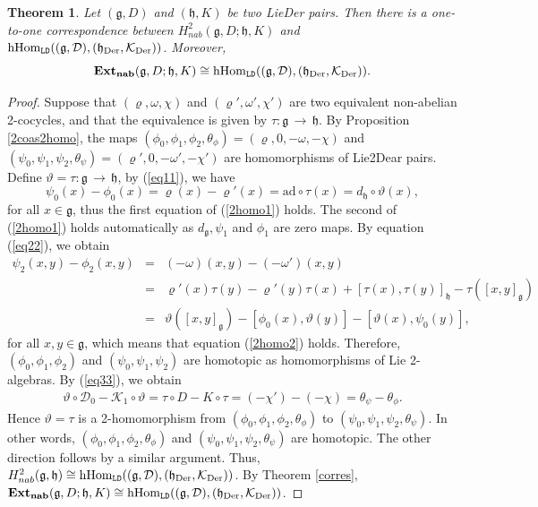 \documentclass[12pt]{amsart}
\newtheorem{thm}{Theorem}[section]
\newcommand{\lon }{\,\rightarrow\,}
\newcommand{\g}{\mathfrak g}
\newcommand{\h}{\mathfrak h}
\newcommand{\huaD}{\mathcal{D}}
\newcommand{\huaK}{\mathcal{K}}
\newcommand{\LD}{{\rm LieDer }}
\newcommand{\Der}{\mathrm{Der}}
\newcommand{\ad}{\mathrm{ad}}
\begin{document}
\begin{thm}\label{0000}
Let $(\g,D)$ and $(\h,K)$ be two \LD pairs. Then there is a one-to-one correspondence between $H^2_{nab}(\g,D; \h, K)$ and $\rm{hHom}_{\mathtt{LD}}((\g,\huaD),(\h_{\Der},\huaK_{\Der}))$. Moreover,
\begin{equation*}
{\rm{\bf Ext_{nab}}}(\g, D; \h, K)\cong \rm{hHom}_{\mathtt{LD}}((\g,\huaD),(\h_{\Der},\huaK_{\Der})).
\end{equation*}
\end{thm}
\begin{proof}
Suppose that $(\varrho,\omega,\chi)$ and $(\varrho',\omega',\chi')$ are two equivalent non-abelian 2-cocycles, and that the equivalence is given by $\tau:\g\lon\h$. By Proposition \ref{2coas2homo}, the maps $(\phi_{0},\phi_{1},\phi_{2},\theta_{\phi})=(\varrho,0,-\omega,-\chi)$ and 
$(\psi_{0},\psi_{1},\psi_{2},\theta_{\psi})=(\varrho',0,-\omega',-\chi')$ are homomorphisms of Lie2Dear pairs. Define $\vartheta=\tau:\g\lon\h$, by (\ref{eq11}), we have
\begin{equation*}
\psi_{0}(x)-\phi_{0}(x)=\varrho (x)-\varrho'(x)=\ad \circ \tau(x)=d_{\h}\circ \vartheta(x),
\end{equation*}
for all $x\in \g$, thus the first equation of (\ref{2homo1}) holds. The second of (\ref{2homo1}) holds automatically as $d_{\g}, \psi_{1}$ and $\phi_{1}$ are zero maps. By equation (\ref{eq22}), we obtain
\begin{eqnarray*}
\psi_{2}(x,y)-\phi_{2}(x,y)&=&(-\omega)(x,y)-(-\omega')(x,y)\\
&=&\varrho'(x)\tau(y)-\varrho'(y)\tau(x)+[\tau(x), \tau(y)]_\h-\tau([x, y]_\g)\\
&=&\vartheta([x,y]_{\g})-[\phi_{0}(x),\vartheta (y)]-[\vartheta (x),\psi_{0}(y)],
\end{eqnarray*}
for all $x,y\in \g$, which means that equation (\ref{2homo2}) holds. Therefore, $(\phi_{0},\phi_{1},\phi_{2})$ and $(\psi_{0},\psi_{1},\psi_{2})$ are homotopic as homomorphisms of Lie 2-algebras. By (\ref{eq33}), we obtain
\begin{eqnarray*}
\vartheta \circ \huaD_{0}-\huaK_{1}\circ \vartheta=\tau\circ D-K\circ \tau=(-\chi')-(-\chi)=\theta_{\psi}-\theta_{\phi}.
\end{eqnarray*}
Hence $\vartheta=\tau$ is a 2-homomorphism from $(\phi_{0},\phi_{1},\phi_{2},\theta_{\phi})$ to 
$(\psi_{0},\psi_{1},\psi_{2},\theta_{\psi})$. In other words, $(\phi_{0},\phi_{1},\phi_{2},\theta_{\phi})$ and 
$(\psi_{0},\psi_{1},\psi_{2},\theta_{\psi})$ are homotopic. The other direction follows by a similar argument. Thus, $H^2_{nab}(\g,\h)\cong\rm{hHom}_{\mathtt{LD}}((\g,\huaD),(\h_{\Der},\huaK_{\Der}))$. By Theorem \ref{corres},
${\rm{\bf Ext_{nab}}}(\g, D; \h, K)\cong \rm{hHom}_{\mathtt{LD}}((\g,\huaD),(\h_{\Der},\huaK_{\Der}))$.
\end{proof}
\end{document}

